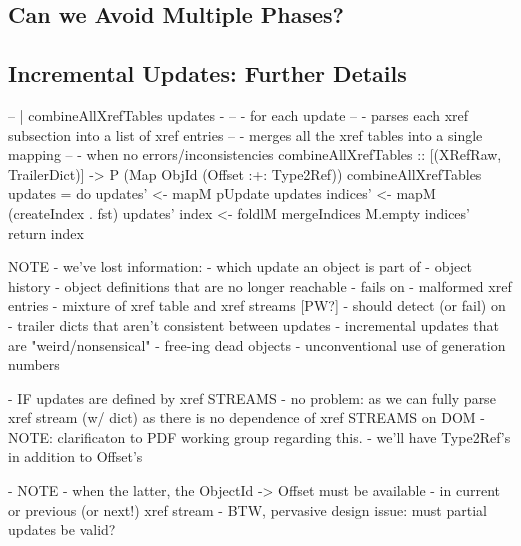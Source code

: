 \subsection{Can we Avoid Multiple Phases?}


\subsection{Incremental Updates: Further Details}
   
\begin{code}
-- | combineAllXrefTables updates - 
--   - for each update
--     - parses each xref subsection into a list of xref entries
--   - merges all the xref tables into a single mapping
--     - when no errors/inconsistencies
combineAllXrefTables
  :: [(XRefRaw, TrailerDict)] -> P (Map ObjId (Offset :+: Type2Ref))
combineAllXrefTables updates =
  do
  updates' <- mapM pUpdate updates  
  indices' <- mapM (createIndex . fst) updates' 
  index    <- foldlM mergeIndices M.empty indices'
  return index
\end{code}

NOTE
 - we've lost information:
   - which update an object is part of
   - object history
   - object definitions that are no longer reachable
 - fails on
   - malformed xref entries
   - mixture of xref table and xref streams [PW?]
 - should detect (or fail) on
   - trailer dicts that aren't consistent between updates
   - incremental updates that are "weird/nonsensical"
     - free-ing dead objects
     - unconventional use of generation numbers
         
 - IF updates are defined by xref STREAMS
   - no problem: as we can fully parse xref stream (w/ dict) as
     there is no dependence of xref STREAMS on DOM
     - NOTE: clarificaton to PDF working group regarding this.
   - we'll have Type2Ref's in addition to Offset's
      
 - NOTE 
   - when the latter, the ObjectId -> Offset must be available
       - in current or previous (or next!) xref stream
         - BTW, pervasive design issue: must partial updates be valid?



